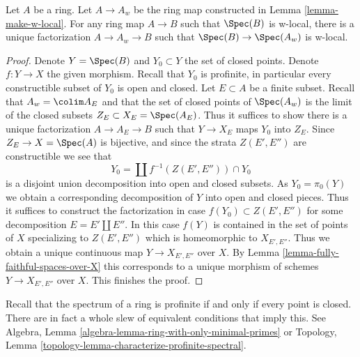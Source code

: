 \begin{lemma}
\label{lemma-universal}
Let $A$ be a ring. Let $A \to A_w$ be the ring map constructed in
Lemma \ref{lemma-make-w-local}. For any ring map $A \to B$ such that
$\Spec(B)$ is w-local, there is a unique factorization $A \to A_w \to B$
such that $\Spec(B) \to \Spec(A_w)$ is w-local.
\end{lemma}

\begin{proof}
Denote $Y = \Spec(B)$ and $Y_0 \subset Y$ the set of closed points.
Denote $f : Y \to X$ the given morphism.
Recall that $Y_0$ is profinite, in particular every constructible
subset of $Y_0$ is open and closed. Let $E \subset A$ be a finite subset.
Recall that $A_w = \colim A_E$ and that the set of closed points of
$\Spec(A_w)$ is the limit of the closed subsets $Z_E \subset X_E = \Spec(A_E)$.
Thus it suffices to show there is a unique factorization $A \to A_E \to B$
such that $Y \to X_E$ maps $Y_0$ into $Z_E$.
Since $Z_E \to X = \Spec(A)$ is bijective, and since the strata
$Z(E', E'')$ are constructible we see that
$$
Y_0 = \coprod f^{-1}(Z(E', E'')) \cap Y_0
$$
is a disjoint union decomposition into open and closed subsets.
As $Y_0 = \pi_0(Y)$ we obtain a corresponding decomposition of
$Y$ into open and closed pieces. Thus it suffices to construct
the factorization in case $f(Y_0) \subset Z(E', E'')$ for
some decomposition $E = E' \amalg E''$.
In this case $f(Y)$ is contained in the set of points of $X$
specializing to $Z(E', E'')$ which is homeomorphic to $X_{E', E''}$.
Thus we obtain a unique continuous map $Y \to X_{E', E''}$ over $X$. By
Lemma \ref{lemma-fully-faithful-spaces-over-X}
this corresponds to a unique morphism of schemes
$Y \to X_{E', E''}$ over $X$. This finishes the proof.
\end{proof}

\noindent
Recall that the spectrum of a ring is profinite if and only if
every point is closed. There are in fact a whole slew of equivalent
conditions that imply this. See
Algebra, Lemma \ref{algebra-lemma-ring-with-only-minimal-primes} or
Topology, Lemma \ref{topology-lemma-characterize-profinite-spectral}.

